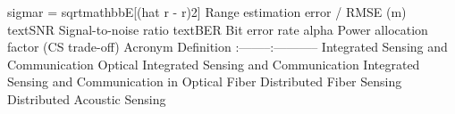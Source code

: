 {}\markdownRendererPipe{} \markdownRendererDollarSign{}\markdownRendererBackslash{}sigma\markdownRendererUnderscore{}r = \markdownRendererBackslash{}sqrt\markdownRendererLeftBrace{}\markdownRendererBackslash{}mathbb\markdownRendererLeftBrace{}E\markdownRendererRightBrace{}[(\markdownRendererBackslash{}hat r - r)\markdownRendererCircumflex{}2]\markdownRendererRightBrace{}\markdownRendererDollarSign{} \markdownRendererPipe{} Range estimation error / RMSE (m) \markdownRendererPipe{}\markdownRendererSoftLineBreak
{}\markdownRendererPipe{} \markdownRendererDollarSign{}\markdownRendererBackslash{}text\markdownRendererLeftBrace{}SNR\markdownRendererRightBrace{}\markdownRendererDollarSign{} \markdownRendererPipe{} Signal-to-noise ratio \markdownRendererPipe{}\markdownRendererSoftLineBreak
{}\markdownRendererPipe{} \markdownRendererDollarSign{}\markdownRendererBackslash{}text\markdownRendererLeftBrace{}BER\markdownRendererRightBrace{}\markdownRendererDollarSign{} \markdownRendererPipe{} Bit error rate \markdownRendererPipe{}\markdownRendererSoftLineBreak
{}\markdownRendererPipe{} \markdownRendererDollarSign{}\markdownRendererBackslash{}alpha\markdownRendererDollarSign{} \markdownRendererPipe{} Power allocation factor (C\markdownRendererAmpersand{}S trade-off) \markdownRendererPipe{}\markdownRendererInterblockSeparator
{}
\markdownRendererSectionEnd \markdownRendererSectionBegin
{}\markdownRendererInterblockSeparator
{}\markdownRendererPipe{} Acronym \markdownRendererPipe{} Definition \markdownRendererPipe{}\markdownRendererSoftLineBreak
{}\markdownRendererPipe{}:--------\markdownRendererPipe{}:-----------\markdownRendererPipe{}\markdownRendererSoftLineBreak
{}\markdownRendererPipe{}  \markdownRendererPipe{} Integrated Sensing and Communication \markdownRendererPipe{}\markdownRendererSoftLineBreak
{}\markdownRendererPipe{}  \markdownRendererPipe{} Optical Integrated Sensing and Communication \markdownRendererPipe{}\markdownRendererSoftLineBreak
{}\markdownRendererPipe{}  \markdownRendererPipe{} Integrated Sensing and Communication in Optical Fiber \markdownRendererPipe{}\markdownRendererSoftLineBreak
{}\markdownRendererPipe{}  \markdownRendererPipe{} Distributed Fiber Sensing \markdownRendererPipe{}\markdownRendererSoftLineBreak
{}\markdownRendererPipe{}  \markdownRendererPipe{} Distributed Acoustic Sensing \markdownRendererPipe{}\markdownRendererSoftLineBreak

